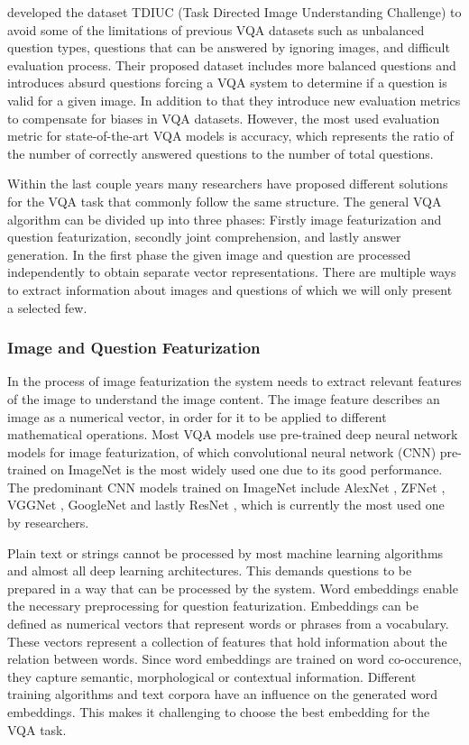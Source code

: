 \documentclass{article}
\begin{document}
\citet{kafle2017tdiuc} developed the dataset TDIUC (Task Directed Image Understanding Challenge) to avoid some of the limitations of previous VQA datasets such as unbalanced question types, questions that can be answered by ignoring images, and difficult evaluation process. Their proposed dataset includes more balanced questions and introduces absurd questions forcing a VQA system to determine if a question is valid for a given image. In addition to that they introduce new evaluation metrics to compensate for biases in VQA datasets. However, the most used evaluation metric for state-of-the-art VQA models is accuracy, which represents the ratio of the number of correctly answered questions to the number of total questions.

Within the last couple years many researchers have proposed different solutions for the VQA task that commonly follow the same structure. The general VQA algorithm can be divided up into three phases: Firstly image featurization and question featurization, secondly joint comprehension, and lastly answer generation.
In the first phase the given image and question are processed independently to obtain separate vector representations. There are multiple ways to extract information about images and questions of which we will only present a selected few.

\subsubsection{Image and Question Featurization}

In the process of image featurization the system needs to extract relevant features of the image to understand the image content. The image feature describes an image as a numerical vector, in order for it to be applied to different mathematical operations. Most VQA models use pre-trained deep neural network models for image featurization, of which convolutional neural network (CNN) \citep{krizhevsky2012imagenet} pre-trained on ImageNet \citep{russakovsky2015imagenet} is the most widely used one due to its good performance. The predominant CNN models trained on ImageNet include AlexNet \citep{krizhevsky2012imagenet}, ZFNet \citep{zeiler2014visual}, VGGNet \citep{simonyan2015very}, GoogleNet \citep{szegedy2015going} and lastly ResNet \citep{residual}, which is currently the most used one by researchers.

Plain text or strings cannot be processed by most machine learning algorithms and almost all deep learning architectures. This demands questions to be prepared in a way that can be processed by the system. Word embeddings enable the necessary preprocessing for question featurization. Embeddings can be defined as numerical vectors that represent words or phrases from a vocabulary. These vectors represent a collection of features that hold information about the relation between words. Since word embeddings are trained on word co-occurence, they capture semantic, morphological or contextual information. Different training algorithms and text corpora have an influence on the generated word embeddings. This makes it challenging to choose the best embedding for the VQA task.
\end{document}
